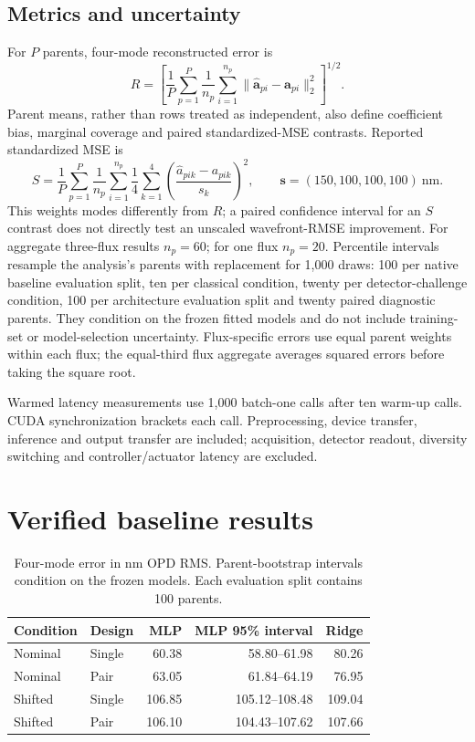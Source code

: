 \documentclass[11pt,a4paper]{article}
\begin{document}
\subsection{Metrics and uncertainty}
For $P$ parents, four-mode reconstructed error is
\begin{equation}
 R=\left[\frac1 P\sum_{p=1}^P\frac1{n_p}
                \sum_{i=1}^{n_p}\|\widehat{\boldsymbol a}_{pi}-\boldsymbol a_{pi}\|_2^2
          \right]^{1/2}.
\end{equation}
Parent means, rather than rows treated as independent, also define coefficient
bias, marginal coverage and paired standardized-MSE contrasts. Reported
standardized MSE is
\begin{equation}
 S=\frac1P\sum_{p=1}^P\frac1{n_p}\sum_{i=1}^{n_p}
       \frac14\sum_{k=1}^4\left(\frac{\widehat a_{pik}-a_{pik}}{s_k}\right)^2,
 \qquad \boldsymbol s=(150,100,100,100)\ \mathrm{nm}.
\end{equation}
This weights modes differently from $R$; a paired confidence interval for
an $S$ contrast does not directly test an unscaled wavefront-RMSE improvement.
For aggregate three-flux results $n_p=60$; for one flux $n_p=20$.
Percentile intervals resample the analysis's parents with replacement for
1,000 draws: 100 per native baseline evaluation split, ten per classical
condition, twenty per detector-challenge condition, 100 per architecture
evaluation split and twenty paired diagnostic parents.
They condition on the frozen fitted models and do not include training-set or
model-selection uncertainty. Flux-specific errors use equal parent weights
within each flux; the equal-third flux aggregate averages squared errors before
taking the square root.

Warmed latency measurements use 1,000 batch-one calls after ten warm-up calls.
CUDA synchronization brackets each call. Preprocessing, device transfer,
inference and output transfer are included; acquisition, detector readout,
diversity switching and controller/actuator latency are excluded.

\section{Verified baseline results}
\begin{table}[ht]
\centering\small
\caption{Four-mode error in nm OPD RMS. Parent-bootstrap intervals condition on
the frozen models. Each evaluation split contains 100 parents.}
\begin{tabular}{@{}llrrr@{}}
\toprule
Condition&Design&MLP&MLP 95\% interval&Ridge\\
\midrule
Nominal&Single&60.38&58.80--61.98&80.26\\
Nominal&Pair&63.05&61.84--64.19&76.95\\
Shifted&Single&106.85&105.12--108.48&109.04\\
Shifted&Pair&106.10&104.43--107.62&107.66\\
\bottomrule
\end{tabular}
\label{tab:baseline}
\end{table}
\end{document}
